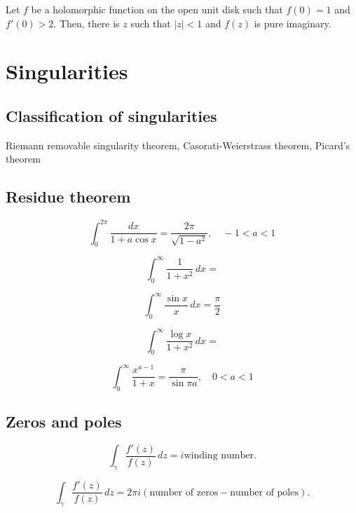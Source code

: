 \documentclass{../note}
\begin{document}
\begin{prb}
Let $f$ be a holomorphic function on the open unit disk such that $f(0)=1$ and $f'(0)>2$.
Then, there is $z$ such that $|z|<1$ and $f(z)$ is pure imaginary.
\end{prb}



\chapter{Singularities}

\section{Classification of singularities}
Riemann removable singularity theorem,
Casorati-Weierstrass theorem,
Picard's theorem


\section{Residue theorem}
\[\int_0^{2\pi}\frac{dx}{1+a\cos x}=\frac{2\pi}{\sqrt{1-a^2}},\quad-1<a<1\]
\begin{prb}[Semicircles]
\begin{parts}
\item \[\int_0^\infty\frac1{1+x^2}\,dx=\]
\item \[\int_0^\infty\frac{\sin x}x\,dx=\frac\pi2\]
\item \[\int_0^\infty\frac{\log x}{1+x^2}\,dx=\]
\item \[\int_0^\infty\frac{x^{a-1}}{1+x}=\frac\pi{\sin\pi a},\quad0<a<1\]
\end{parts}
\end{prb}
\begin{prb}
\end{prb}
\begin{prb}
\end{prb}
\begin{prb}
\end{prb}



\section{Zeros and poles}
\begin{prb}
\begin{parts}
\item
\[\int_\gamma\frac{f'(z)}{f(z)}\,dz=i\text{winding number}.\]
\item
\[\int_\gamma\frac{f'(z)}{f(z)}\,dz=2\pi i(\text{number of zeros}-\text{number of poles}).\]
\end{parts}
\end{prb}
\end{document}
